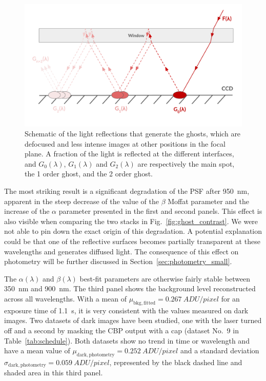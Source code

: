 \begin{figure}%
    \centering
    \includegraphics[width=\columnwidth]{fig/schema_ghost.pdf}
    \caption{Schematic of the light reflections that generate the ghosts, which are defocused and less intense images at other positions in the focal plane. A fraction of the light is reflected at the different interfaces, and $G_0(\lambda)$, $G_1(\lambda)$ and $G_2(\lambda)$ are respectively the main spot, the 1 order ghost, and the 2 order ghost.}
    \label{fig:schema_ghost}
\end{figure}

The most striking result is a significant degradation of the PSF
after \SI{950}{nm}, apparent in the steep decrease of the value of
the $\beta$ Moffat parameter and the increase of the $\alpha$
parameter presented in the first and second panels. This effect is also
visible when comparing the two stacks in
Fig.~\ref{fig:ghost_contrast}. We were not able to pin down the exact
origin of this degradation. A potential explanation could be that one
of the reflective surfaces becomes partially transparent at these
wavelengths and generates diffused light. The consequence of this
effect on photometry will be further discussed in Section~\ref{sec:photometry_small}.

The $\alpha(\lambda)$ and $\beta(\lambda)$ best-fit parameters are
otherwise fairly stable between \SI{350}{\nano\meter} and
\SI{900}{\nano\meter}. The third panel shows the background level
reconstructed across all wavelengths. With a mean of
$\mu_\mathrm{bkg, fitted}=\SI{0.267}{ADU/pixel}$ for an exposure time
of \SI{1.1}{\second}, it is very consistent with the values measured
on dark images. Two datasets of dark images have been studied, one
with the laser turned off and a second by masking the CBP output with
a cap (dataset No.~9 in Table~\ref{tab:schedule}). Both datasets show
no trend in time or wavelength and have a mean value of
$\mu_\mathrm{dark, photometry}=\SI{0.252}{ADU/pixel}$ and a standard
deviation $\sigma_\mathrm{dark, photometry}=\SI{0.059}{ADU/pixel}$,
represented by the black dashed line and shaded area in this third
panel.

